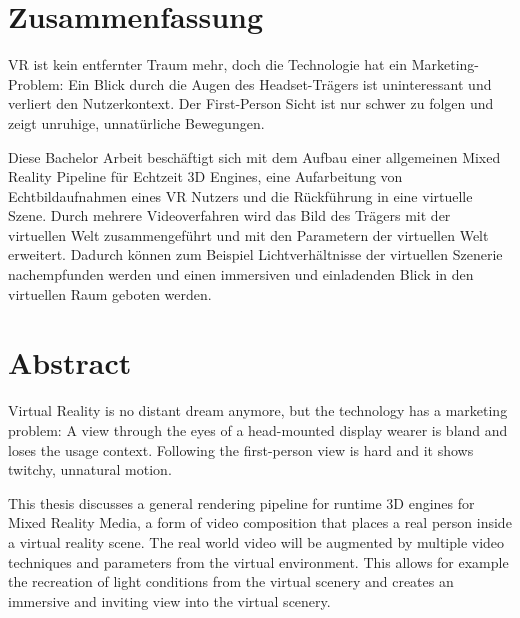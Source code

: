 %
\chapter*{Zusammenfassung}
\label{sec:abstract}
\vspace*{-10mm}

VR ist kein entfernter Traum mehr, doch die Technologie hat ein 
Marketing-Problem: Ein Blick durch die Augen des Headset-Trägers ist 
uninteressant und verliert den Nutzerkontext. Der First-Person Sicht ist nur 
schwer zu folgen und zeigt unruhige, unnatürliche Bewegungen.

Diese Bachelor Arbeit beschäftigt sich mit dem Aufbau einer allgemeinen Mixed 
Reality Pipeline für Echtzeit 3D Engines, eine Aufarbeitung von 
Echtbildaufnahmen eines VR Nutzers und die Rückführung in eine virtuelle Szene. 
Durch mehrere Videoverfahren wird das Bild des Trägers mit der virtuellen Welt 
zusammengeführt und mit den Parametern der virtuellen Welt erweitert.
\newline
Dadurch können zum Beispiel Lichtverhältnisse der virtuellen Szenerie 
nachempfunden werden und einen immersiven und einladenden Blick in den 
virtuellen Raum geboten werden.

\begin{center}
	\hrulefill
\end{center}

\vspace*{-20mm}
{\let\clearpage\relax\chapter*{Abstract}}
\vspace*{-10mm}

Virtual Reality is no distant dream anymore, but the technology has a 
marketing problem: A view through the eyes of a head-mounted display wearer 
is bland and loses the usage context. Following the first-person view is hard 
and it shows twitchy, unnatural motion.

This thesis discusses a general rendering pipeline for runtime 3D engines for 
Mixed Reality Media, a form of video composition that places a real person 
inside a virtual reality scene. The real world video will be augmented by 
multiple video techniques and parameters from the virtual environment.
\newline
This allows for example the recreation of light conditions from the virtual 
scenery and creates an immersive and inviting view into the virtual scenery.